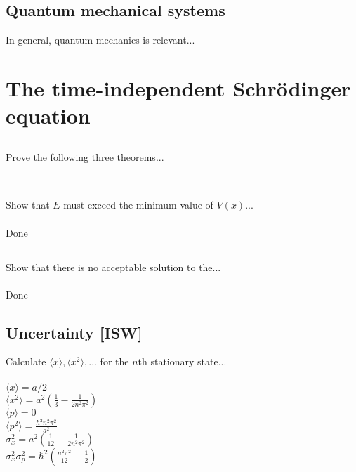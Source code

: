 \documentclass{article}
\newcommand{\<}{\langle}
\renewcommand{\>}{\rangle}
\begin{document}
\subsection{Quantum mechanical systems}
In general, quantum mechanics is relevant...

\section{The time-independent Schr\"odinger equation}

\subsection{}
Prove the following three theorems...
\\ \\
\subsection{}
Show that $E$ must exceed the minimum value of $V(x)$...
\\ \\
Done
\subsection{}
Show that there is no acceptable solution to the...
\\ \\
Done
\subsection{Uncertainty [ISW]}
Calculate $\<x\>, \<x^2\>,...$ for the $n$th stationary state...
\\ \\
$\<x\> = a/2$ \\
$\<x^2\> = a^2 \left( \frac{1}{3} - \frac{1}{2n^2\pi^2} \right)$ \\
$\<p\> = 0$ \\
$\<p^2\> = \frac{\hbar^2 n^2 \pi^2}{a^2} $ \\
$\sigma_x^2 = a^2 \left( \frac{1}{12} - \frac{1}{2n^2\pi^2} \right) $ \\
$\sigma_x^2 \sigma_p^2 = \hbar^2 \left( \frac{n^2 \pi^2}{12} - \frac{1}{2} \right)$
\end{document}
